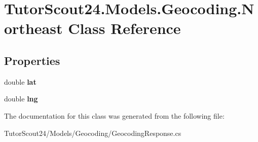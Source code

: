 \hypertarget{class_tutor_scout24_1_1_models_1_1_geocoding_1_1_northeast}{}\section{Tutor\+Scout24.\+Models.\+Geocoding.\+Northeast Class Reference}
\label{class_tutor_scout24_1_1_models_1_1_geocoding_1_1_northeast}
\subsection*{Properties}
\begin{DoxyCompactItemize}
\item 
\mbox{\label{class_tutor_scout24_1_1_models_1_1_geocoding_1_1_northeast_aca2f3054f87af128b9a21ba1205f74a7}} 
double {\bfseries lat}
\item 
\mbox{\label{class_tutor_scout24_1_1_models_1_1_geocoding_1_1_northeast_addac52b07bbfca45aa09991fc94c674c}} 
double {\bfseries lng}
\end{DoxyCompactItemize}


The documentation for this class was generated from the following file\+:\begin{DoxyCompactItemize}
\item 
Tutor\+Scout24/\+Models/\+Geocoding/Geocoding\+Response.\+cs\end{DoxyCompactItemize}
